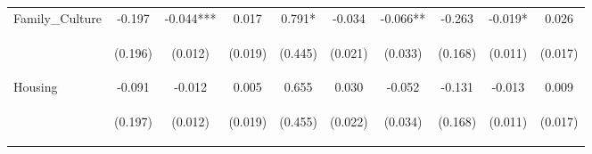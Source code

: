 \begin{tabular}{lccccccccc}
\noalign{\smallskip}Family_Culture & -0.197 & -0.044*** & 0.017 & 0.791* & -0.034 & -0.066** & -0.263 & -0.019* & 0.026\\
 & \begin{footnotesize}(0.196)\end{footnotesize} & \begin{footnotesize}(0.012)\end{footnotesize} & \begin{footnotesize}(0.019)\end{footnotesize} & \begin{footnotesize}(0.445)\end{footnotesize} & \begin{footnotesize}(0.021)\end{footnotesize} & \begin{footnotesize}(0.033)\end{footnotesize} & \begin{footnotesize}(0.168)\end{footnotesize} & \begin{footnotesize}(0.011)\end{footnotesize} & \begin{footnotesize}(0.017)\end{footnotesize}\\
\noalign{\smallskip}Housing & -0.091 & -0.012 & 0.005 & 0.655 & 0.030 & -0.052 & -0.131 & -0.013 & 0.009\\
 & \begin{footnotesize}(0.197)\end{footnotesize} & \begin{footnotesize}(0.012)\end{footnotesize} & \begin{footnotesize}(0.019)\end{footnotesize} & \begin{footnotesize}(0.455)\end{footnotesize} & \begin{footnotesize}(0.022)\end{footnotesize} & \begin{footnotesize}(0.034)\end{footnotesize} & \begin{footnotesize}(0.168)\end{footnotesize} & \begin{footnotesize}(0.011)\end{footnotesize} & \begin{footnotesize}(0.017)\end{footnotesize}\\

\end{tabular}
